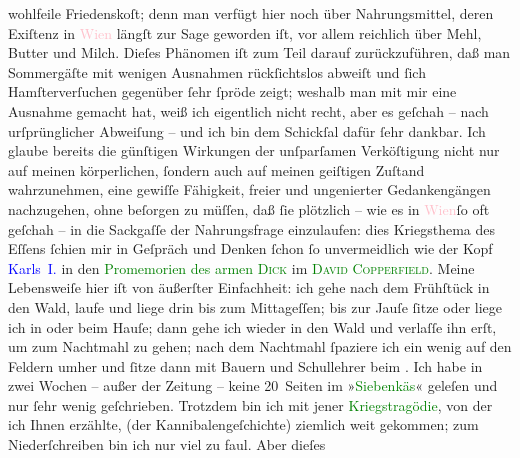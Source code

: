                wohlfeile Friedenskoſt; denn man verfügt hier noch über Nahrungsmittel, deren
               Exiſtenz in \textcolor{pink}{Wien}{}\ledrightnote{\textcolor{pink}{Wien}} längſt zur Sage geworden iſt, vor
               allem reichlich über Mehl, Butter und Milch. Dieſes Phänomen iſt zum Teil darauf
               zurückzuführen, daß man Sommergäſte mit wenigen Ausnahmen rückſichtslos abweiſt und
               ſich Hamſterverſuchen gegenüber ſehr ſpröde zeigt; weshalb man mit mir eine Ausnahme
               gemacht hat, weiß ich eigentlich nicht recht, aber es geſchah – nach urſprünglicher
               Abweiſung – und ich bin dem Schickſal dafür ſehr dankbar. Ich glaube bereits die
               günſtigen Wirkungen der unſparſamen {\pb}Verköſtigung nicht nur auf meinen körperlichen, ſondern auch auf meinen geiſtigen
               Zuſtand wahrzunehmen, eine gewiſſe Fähigkeit, freier und ungenierter Gedankengängen
               nachzugehen, ohne beſorgen zu müſſen, daß ſie plötzlich – wie es in \textcolor{pink}{Wien}{}\ledrightnote{\textcolor{pink}{Wien}}{ }ſo oft geſchah – in die Sackgaſſe der Nahrungsfrage
               einzulaufen: dies Kriegsthema des Eſſens ſchien mir in Geſpräch und Denken ſchon ſo
               unvermeidlich wie der Kopf \textcolor{blue}{Karls I.}{}\ledrightnote{\textcolor{blue}{Charles I von England}} in den \textcolor{green}{Promemorien des armen \textsc{Dick}}{} im \textcolor{green}{\textsc{David Copperfield}}{}\ledrightnote{\textcolor{green}{David Copperfield}}.\pend
           \pstart
           Meine Lebensweiſe hier iſt von äußerſter Einfachheit: ich gehe nach dem Frühſtück in
               den Wald, laufe und liege drin bis zum Mittageſſen; bis zur Jauſe ſitze oder liege
               ich in oder beim Hauſe; dann gehe ich wieder in den Wald und verlaſſe ihn erſt, um
               zum Nachtmahl zu gehen; nach dem Nachtmahl ſpaziere ich ein wenig auf den Feldern
               umher und ſitze dann mit Bauern und Schul{\pb}lehrer beim \label{K_L02289_1v}\label{K_L02289_1h}. Ich habe in
               zwei Wochen – außer der Zeitung – keine 20 Seiten im »\textcolor{green}{Siebenkäs}{}\ledrightnote{\textcolor{green}{Siebenkäs}}« geleſen und nur ſehr wenig geſchrieben. Trotzdem bin ich mit
               jener \textcolor{green}{Kriegstragödie}{}, von der ich Ihnen erzählte, (der Kannibalengeſchichte)
               ziemlich weit gekommen; zum Niederſchreiben bin ich nur viel zu faul. Aber dieſes
